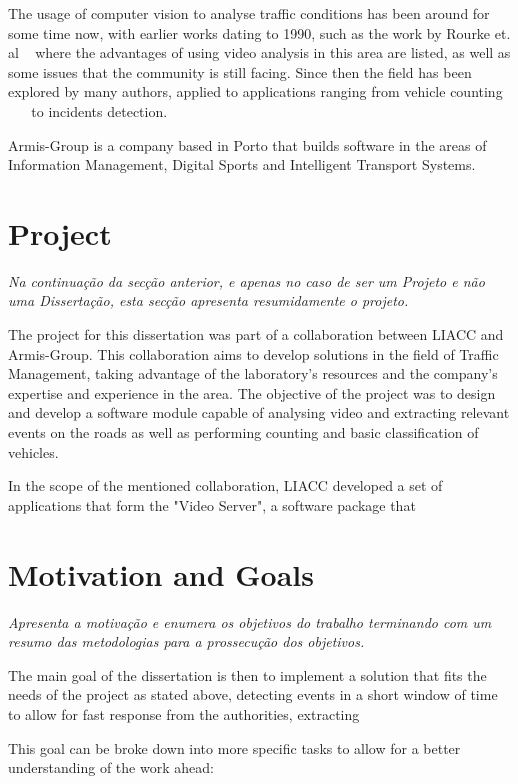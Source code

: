 The usage of computer vision to analyse traffic conditions has been around for some time now, with earlier works dating to 1990, such as the work by Rourke et. al ~\cite{rourke_road_1990} where the advantages of using video analysis in this area are listed, as well as some issues that the community is still facing. Since then the field has been explored by many authors, applied to applications ranging from vehicle counting ~\cite{coifman_real-time_1998} ~\cite{beymer_real-time_1997} to incidents detection. 

Armis-Group is a company based in Porto that builds software in the areas of Information Management, Digital Sports and Intelligent Transport Systems.

\section{Project} \label{sec:proj}

\textit{
Na continuação da secção anterior, e apenas no caso de ser um Projeto
e não uma Dissertação, esta secção apresenta resumidamente o projeto.
}

The project for this dissertation was part of a collaboration between LIACC and Armis-Group. This collaboration aims to develop solutions in the field of Traffic Management, taking advantage of the laboratory's resources and the company's expertise and experience in the area. The objective of the project was to design and develop a software module capable of analysing video and extracting relevant events on the roads as well as performing counting and basic classification of vehicles. 

In the scope of the mentioned collaboration, LIACC developed a set of applications that form the "Video Server", a software package that 

\section{Motivation and Goals} \label{sec:goals}

\textit{
Apresenta a motivação e enumera os objetivos do trabalho terminando
com um resumo das metodologias para a prossecução dos objetivos.
}

The main goal of the dissertation is then to implement a solution that fits the needs of the project as stated above, detecting events in a short window of time to allow for fast response from the authorities, extracting 

This goal can be broke down into more specific tasks to allow for a better understanding of the work ahead:

